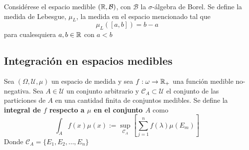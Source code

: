 \begin{definicion}
Considérese el espacio medible $(\mathbb{R}, \mathcal{B})$, con $\mathcal{B}$ la $\sigma$-álgebra de Borel. Se define la medida de Lebesgue, $\mu_L$, la medida en el espacio mencionado tal que 
\begin{equation}
\mu_L([a,b]) = b-a
\end{equation}
para cualesquiera $a,b \in \mathbb{R}$ con $a<b$
\end{definicion}


\subsection{Integración en espacios medibles}

\begin{definicion}
Sea $(\Omega, \mathcal{U}, \mu)$ un espacio de medida y sea $f:\omega \rightarrow \mathbb{R}_+$ una función medible no-negativa. Sea $A\in \mathcal{U}$ un conjunto arbitrario y $\mathcal{C}_A \subset \mathcal{U}$ el conjunto de las particiones de $A$ en una cantidad finita de conjuntos medibles.
Se define la \textbf{integral de $f$ respecto a $\mu$ en el conjunto $A$} como
\begin{equation}
\int_A f(x) \mu(x) := \sup_{\mathcal{C}_A} \left[ \sum_{j=1}^{n} f(\lambda) \mu(E_m) \right]
\end{equation}
Donde $\mathcal{C}_A = \{ E_1, E_2, \dots, E_n \}$
\end{definicion}

